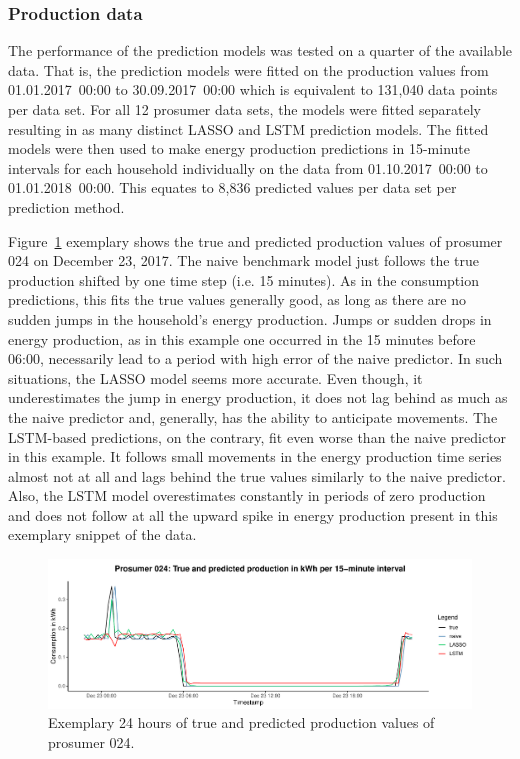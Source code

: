 \subsubsection{Production data}

The performance of the prediction models was tested on a quarter of the available data. That is, the prediction models were fitted on the production values from 01.01.2017~00:00 to 30.09.2017~00:00 which is equivalent to 131,040 data points per data set. For all 12 prosumer data sets, the models were fitted separately resulting in as many distinct LASSO and LSTM prediction models. The fitted models were then used to make energy production predictions in 15-minute intervals for each household individually on the data from 01.10.2017~00:00 to 01.01.2018~00:00. This equates to 8,836 predicted values per data set per prediction method.

Figure~\ref{Fig:glimpse_predprod} exemplary shows the true and predicted production values of prosumer 024 on December 23, 2017. The naive benchmark model just follows the true production shifted by one time step (i.e. 15 minutes). As in the consumption predictions, this fits the true values generally good, as long as there are no sudden jumps in the household's energy production. Jumps or sudden drops in energy production, as in this example one occurred in the 15 minutes before 06:00, necessarily lead to a period with high error of the naive predictor. In such situations, the LASSO model seems more accurate. Even though, it underestimates the jump in energy production, it does not lag behind as much as the naive predictor and, generally, has the ability to anticipate movements. The LSTM-based predictions, on the contrary, fit even worse than the naive predictor in this example. It follows small movements in the energy production time series almost not at all and lags behind the true values similarly to the naive predictor. Also, the LSTM model overestimates constantly in periods of zero production and does not follow at all the upward spike in energy production present in this exemplary snippet of the data.
%
\begin{figure}[htbp]
    \centering
    \includegraphics[width=\textwidth]{thesis/graphs/evaluation/p024_pred_prod.pdf}
    \caption[Exemplary 24 hours of true and predicted production values]{Exemplary 24 hours of true and predicted production values of prosumer 024. \quantnet\href{}{}}
    \label{Fig:glimpse_predprod}
\end{figure}
%

